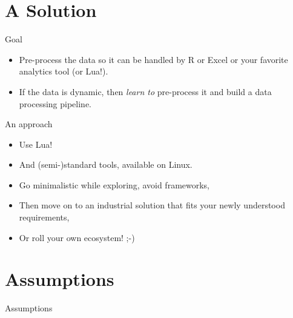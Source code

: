 \documentclass[handout]{beamer}
\begin{document}

\section{A Solution}


\begin{frame}{Goal}

\begin{itemize}
\item Pre-process the data so it can be handled by R or Excel or your favorite
analytics tool (or Lua!).
\item If the data is dynamic, then \textit{learn to} pre-process it
      and build a data processing pipeline.
\end{itemize}

\end{frame}


\begin{frame}{An approach}

\begin{itemize}
\item Use Lua!
\item And (semi-)standard tools, available on Linux.
\item Go minimalistic while exploring, avoid frameworks,
\item Then move on to an industrial solution that fits your newly understood
      requirements,
\item Or roll your own ecosystem! ;-)
\end{itemize}

\end{frame}


\section{Assumptions}


\begin{frame}
\huge Assumptions
\end{frame}
\end{document}
